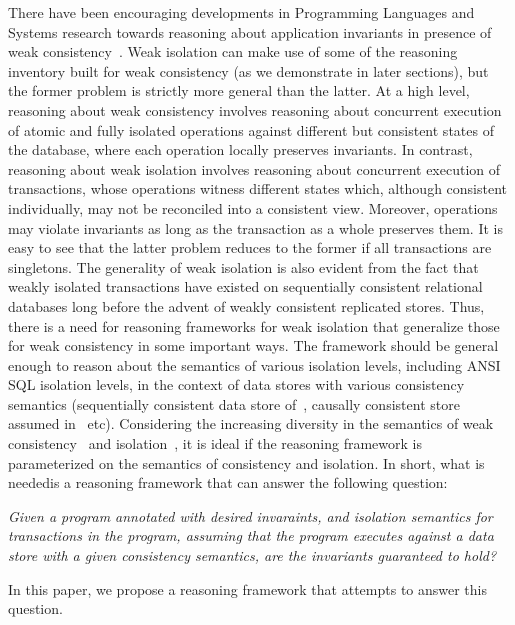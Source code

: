 There have been encouraging developments in Programming Languages and
Systems research towards reasoning about application invariants in
presence of weak consistency~\cite{burckhardt14, redblueosdi,
redblueatc, ecinec, gotsmanpopl16}. Weak isolation can make use of
some of the reasoning inventory built for weak consistency (as we
demonstrate in later sections), but the former problem is strictly
more general than the latter. At a high level, reasoning about weak
consistency involves reasoning about concurrent execution of atomic
and fully isolated operations against different but consistent states
of the database, where each operation locally preserves invariants. In
contrast, reasoning about weak isolation involves reasoning about
concurrent execution of transactions, whose operations witness
different states which, although consistent individually, may not be
reconciled into a consistent view. Moreover, operations may violate
invariants as long as the transaction as a whole preserves them. It is
easy to see that the latter problem reduces to the former if all
transactions are singletons. The generality of weak isolation is also
evident from the fact that weakly isolated transactions have existed
on sequentially consistent relational databases long before the advent
of weakly consistent replicated stores. Thus, there is a need for
reasoning frameworks for weak isolation that generalize those for weak
consistency in some important ways. The framework should be general
enough to reason about the semantics of various isolation levels,
including ANSI SQL isolation levels, in the context of data stores
with various consistency semantics (\eg sequentially consistent data
store of~\cite{adyaphd}, causally consistent store assumed
in~\cite{gotsmanpopl16} etc). Considering the increasing diversity in
the semantics of weak consistency~\cite{zoo} and
isolation~\cite{gotsmanconcur}, it is ideal if the reasoning framework
is parameterized on the semantics of consistency and isolation.  In
short, what is neededis a reasoning framework that can answer the
following question:
\begin{center}
\emph{Given a program annotated with desired invaraints, and isolation
semantics for transactions in the program, assuming that the program
executes against a data store with a given consistency semantics, are
the invariants guaranteed to hold?}
\end{center}

In this paper, we propose a reasoning framework that attempts to
answer this question.

